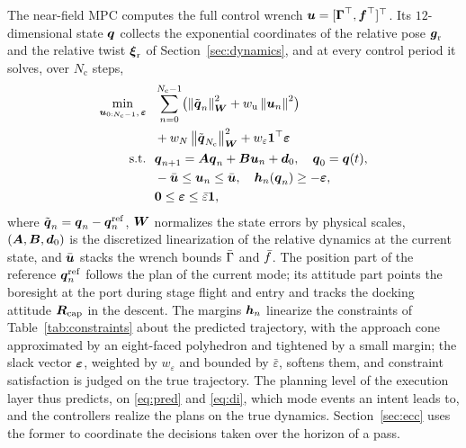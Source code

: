 The near-field MPC computes the full control wrench $\boldsymbol{u}=[\boldsymbol{\Gamma}^{\top},\boldsymbol{f}^{\top}]^{\top}$. Its $12$-dimensional state $\boldsymbol{q}$ collects the exponential coordinates of the relative pose $\boldsymbol{g}_{\mathrm{r}}$ and the relative twist $\boldsymbol{\xi}_{\mathrm{r}}$ of Section~\ref{sec:dynamics}, and at every control period it solves, over $N_{\mathrm{c}}$ steps,
\begin{equation}\label{eq:mpc}
\begin{aligned}
\min_{\boldsymbol{u}_{0:N_{\mathrm{c}}-1},\,\boldsymbol{\varepsilon}}\ \ & \sum_{n=0}^{N_{\mathrm{c}}-1}\bigl(\left\lVert \tilde{\boldsymbol{q}}_{n} \right\rVert_{\boldsymbol{W}}^{2}+w_{\mathrm{u}}\left\lVert \boldsymbol{u}_{n} \right\rVert^{2}\bigr)\\
&+w_{N}\left\lVert \tilde{\boldsymbol{q}}_{N_{\mathrm{c}}} \right\rVert_{\boldsymbol{W}}^{2}+w_{\varepsilon}\boldsymbol{1}^{\top}\boldsymbol{\varepsilon}\\
\text{s.t.}\ \ & \boldsymbol{q}_{n+1}=\boldsymbol{A}\boldsymbol{q}_{n}+\boldsymbol{B}\boldsymbol{u}_{n}+\boldsymbol{d}_{0},\quad \boldsymbol{q}_{0}=\boldsymbol{q}(t),\\
& -\bar{\boldsymbol{u}}\le\boldsymbol{u}_{n}\le\bar{\boldsymbol{u}},\quad \boldsymbol{h}_{n}(\boldsymbol{q}_{n})\ge-\boldsymbol{\varepsilon},\\
& \boldsymbol{0}\le\boldsymbol{\varepsilon}\le\bar\varepsilon\boldsymbol{1},
\end{aligned}
\end{equation}
where $\tilde{\boldsymbol{q}}_{n}=\boldsymbol{q}_{n}-\boldsymbol{q}_{n}^{\mathrm{ref}}$, $\boldsymbol{W}$ normalizes the state errors by physical scales, $(\boldsymbol{A},\boldsymbol{B},\boldsymbol{d}_{0})$ is the discretized linearization of the relative dynamics at the current state, and $\bar{\boldsymbol{u}}$ stacks the wrench bounds $\bar \Gamma$ and $\bar f$. The position part of the reference $\boldsymbol{q}_{n}^{\mathrm{ref}}$ follows the plan of the current mode; its attitude part points the boresight at the port during stage flight and entry and tracks the docking attitude $\boldsymbol{R}_{\mathrm{cap}}$ in the descent. The margins $\boldsymbol{h}_{n}$ linearize the constraints of Table~\ref{tab:constraints} about the predicted trajectory, with the approach cone approximated by an eight-faced polyhedron and tightened by a small margin; the slack vector $\boldsymbol{\varepsilon}$, weighted by $w_{\varepsilon}$ and bounded by $\bar\varepsilon$, softens them, and constraint satisfaction is judged on the true trajectory. The planning level of the execution layer thus predicts, on \eqref{eq:pred} and \eqref{eq:di}, which mode events an intent leads to, and the controllers realize the plans on the true dynamics. Section~\ref{sec:ecc} uses the former to coordinate the decisions taken over the horizon of a pass.
